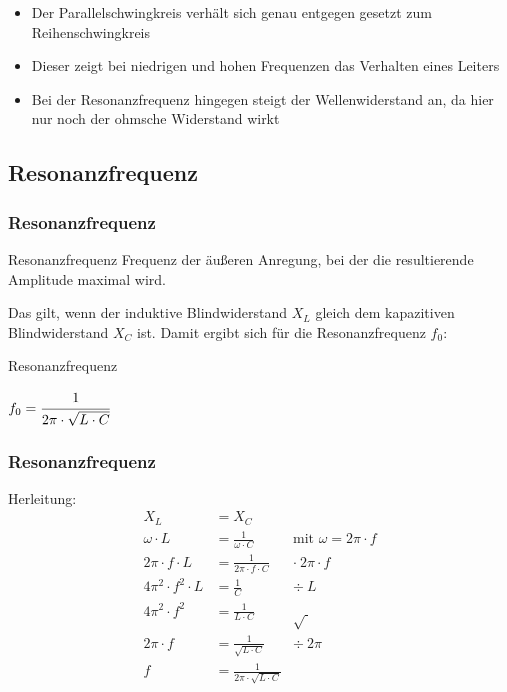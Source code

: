 \begin{frame}
\begin{center}
\begin{minipage}{0.49\textwidth}
\begin{figure}
      \end{figure}
    \end{minipage}
  \end{center}
  \begin{itemize}
    \item Der Parallelschwingkreis verhält sich genau entgegen gesetzt zum Reihenschwingkreis
    \item Dieser zeigt bei niedrigen und hohen Frequenzen das Verhalten eines Leiters
    \item Bei der Resonanzfrequenz hingegen steigt der Wellenwiderstand an, da hier nur noch der ohmsche Widerstand wirkt
  \end{itemize}
\end{frame}

\subsection*{Resonanz\-frequenz}
\begin{frame}
  \frametitle{Resonanzfrequenz}
  \begin{block}{Resonanzfrequenz}
    Frequenz der äußeren Anregung, bei der die resultierende Amplitude maximal wird.
  \end{block}

  Das gilt, wenn der induktive Blindwiderstand $X_L$ gleich dem kapazitiven Blindwiderstand $X_C$ ist. Damit ergibt sich für die Resonanzfrequenz $f_0$:
  \begin{block}{Resonanzfrequenz}
    \begin{center}
      $f_0 = \cfrac{1}{2\pi \cdot \sqrt{L \cdot C}}$
    \end{center}
  \end{block}
\end{frame}

\begin{frame}
  \frametitle{Resonanzfrequenz}
  Herleitung:
  \begin{align*}
    X_L &= X_C \\
    \omega \cdot L &= \frac{1}{\omega \cdot C} & \text{mit } \omega = 2\pi \cdot f \\
    2\pi \cdot f \cdot L &= \frac{1}{2\pi \cdot f \cdot C} & \cdot\  2\pi \cdot f \\
    4\pi^2 \cdot f^2 \cdot L &= \frac{1}{C} & \div\  L \\
    4\pi^2 \cdot f^2 &= \frac{1}{L \cdot C} & \sqrt{\ } \\
    2\pi \cdot f &= \frac{1}{\sqrt{L \cdot C}} & \div\  2\pi \\
    f &= \frac{1}{2\pi \cdot \sqrt{L \cdot C}}
  \end{align*}
\end{frame}


